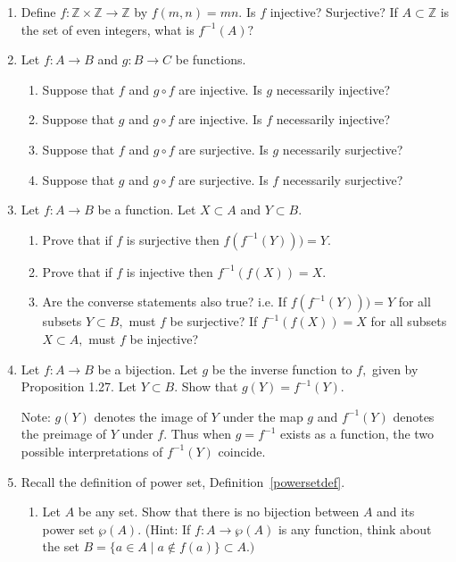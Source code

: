 \documentclass[11pt]{article}
\newcommand{\bbZ}{\mathbb{Z}}
\theoremstyle{definition}
\numberwithin{equation}{subsection}
\begin{document}
\begin{enumerate}
\item 

Define $f:\bbZ\times\bbZ\rightarrow\bbZ$ by $f(m,n)=mn.$  Is $f$ injective?  Surjective?  If
$A\subset \bbZ$ is the set of even integers, what is $f^{-1}(A)?$


\item Let $f:A\to B$ and $g:B\to C$ be functions.
\begin{enumerate}
\item Suppose that $f$ and $g\circ f$ are injective. Is $g$ necessarily injective?
\item Suppose that $g$ and $g\circ f$ are injective. Is $f$ necessarily injective?
\item Suppose that $f$ and $g\circ f$ are surjective. Is $g$ necessarily surjective?
\item Suppose that $g$ and $g\circ f$ are surjective. Is $f$ necessarily surjective?
\end{enumerate}





\item Let $f:A\longrightarrow B$ be a function. Let $X\subset A$ and $Y\subset B.$ 
\begin{enumerate}
\item Prove that if $f$ is surjective then $f(f^{-1} (Y)))=Y.$
 \item Prove that if $f$ is injective then $f^{-1}(f(X))=X.$
 \item Are the converse statements also true? i.e. If $f(f^{-1} (Y)))=Y$ for all subsets $Y\subset B,$ must $f$ be surjective? If $f^{-1}(f(X))=X$ for all subsets $X\subset A,$ must $f$ be injective?
 \end{enumerate}


\item Let $f:A\longrightarrow B$ be a bijection. Let $g$ be the inverse function to $f,$ given by Proposition 1.27.  Let $Y\subset B.$ Show that 
$g(Y)=f^{-1}(Y).$ 

Note: $g(Y)$ denotes the image of $Y$ under the map $g$ and $f^{-1}(Y)$ denotes the preimage of $Y$ under $f.$ Thus when $g=f^{-1}$ exists as a function, the two possible interpretations of $f^{-1}(Y)$ coincide.








\item Recall the definition of power set, Definition~\ref{powersetdef}.
\begin{enumerate}
\item Let $A$ be any set.  Show that there is no bijection between $A$ and its power set $\wp(A).$
(Hint:  If $f:A\rightarrow \wp(A)$ is any function, think about the set
$B=\{a\in A\mid a\not\in f(a)\}\subset A.)$


\end{enumerate}
\end{enumerate}
\end{document}
